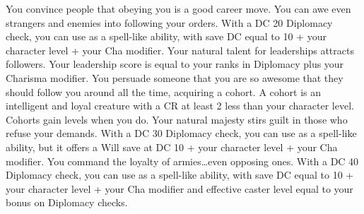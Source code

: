 {You convince people that obeying you is a good career move.}
{You can awe even strangers and enemies into following your orders. With a DC 20 Diplomacy check, you can use  as a spell-like ability, with save DC equal to 10 + \half your character level + your Cha modifier.}
{Your natural talent for leaderships attracts followers. Your leadership score is equal to your ranks in Diplomacy plus your Charisma modifier.}
{You persuade someone that you are so awesome that they should follow you around all the time, acquiring a cohort. A cohort is an intelligent and loyal creature with a CR at least 2 less than your character level. Cohorts gain levels when you do.}
{Your natural majesty stirs guilt in those who refuse your demands. With a DC 30 Diplomacy check, you can use  as a spell-like ability, but it offers a Will save at DC 10 + \half your character level + your Cha modifier.}
{You command the loyalty of armies\ldots even opposing ones. With a DC 40 Diplomacy check, you can use  as a spell-like ability, with save DC equal to 10 + \half your character level + your Cha modifier and effective caster level equal to your bonus on Diplomacy checks.}